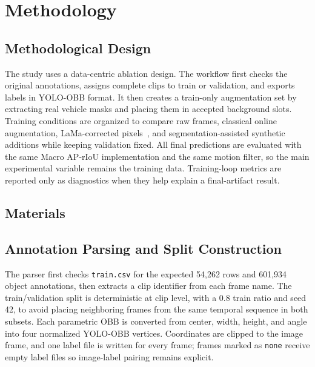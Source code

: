 \section{Methodology}
\label{sec:material_methods}

\subsection{Methodological Design}
\label{sec:study_design}

The study uses a data-centric ablation design. The workflow first checks the original annotations, assigns complete clips to train or validation, and exports labels in YOLO-OBB format. It then creates a train-only augmentation set by extracting real vehicle masks and placing them in accepted background slots. Training conditions are organized to compare raw frames, classical online augmentation, LaMa-corrected pixels~\cite{Suvorov2022LaMa}, and segmentation-assisted synthetic additions while keeping validation fixed. All final predictions are evaluated with the same Macro AP-rIoU implementation and the same motion filter, so the main experimental variable remains the training data. Training-loop metrics are reported only as diagnostics when they help explain a final-artifact result.

\subsection{Materials}
\label{sec:materials}




\subsection{Annotation Parsing and Split Construction}
\label{sec:annotation_preprocessing}

The parser first checks \texttt{train.csv} for the expected 54,262 rows and 601,934 object annotations, then extracts a clip identifier from each frame name. The train/validation split is deterministic at clip level, with a 0.8 train ratio and seed 42, to avoid placing neighboring frames from the same temporal sequence in both subsets. Each parametric OBB is converted from center, width, height, and angle into four normalized YOLO-OBB vertices. Coordinates are clipped to the image frame, and one label file is written for every frame; frames marked as \texttt{none} receive empty label files so image-label pairing remains explicit.

